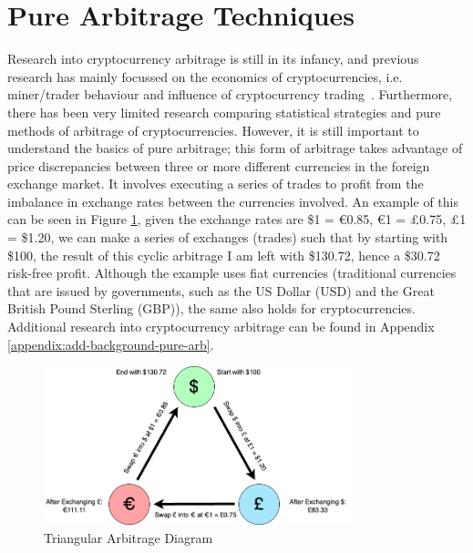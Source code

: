 \section{Pure Arbitrage Techniques}
\label{sec:pure-arb}
Research into cryptocurrency arbitrage is still in its infancy, and previous research has mainly focussed on the economics of cryptocurrencies, i.e. miner/trader behaviour and influence of cryptocurrency trading~\cite{eyal2015miner, avarikioti2020ride, huberman2021monopoly, athey2016bitcoin, easley2019mining, harvey2016cryptofinance, pagnotta2018equilibrium}. Furthermore, there has been very limited research comparing statistical strategies and pure methods of arbitrage of cryptocurrencies. However, it is still important to understand the basics of pure arbitrage; this form of arbitrage takes advantage of price discrepancies between three or more different currencies in the foreign exchange market. It involves executing a series of trades to profit from the imbalance in exchange rates between the currencies involved. An example of this can be seen in Figure \ref{fig:tri-arb}, given the exchange rates are \$1 = \euro 0.85, \euro 1 = \pounds0.75, \pounds1 = \$1.20, we can make a series of exchanges (trades) such that by starting with \$100, the result of this cyclic arbitrage I am left with \$130.72, hence a \$30.72 risk-free profit. Although the example uses fiat currencies (traditional currencies that are issued by governments, such as the US Dollar (USD) and the Great British Pound Sterling (GBP)), the same also holds for cryptocurrencies. Additional research into cryptocurrency arbitrage can be found in Appendix \ref{appendix:add-background-pure-arb}.

\begin{figure}[!htb]
    \centering
    \includegraphics[width=0.8\textwidth]{background/Images/arbitrage_diagram.png}
    \caption{Triangular Arbitrage Diagram\label{fig:tri-arb}}
\end{figure}

